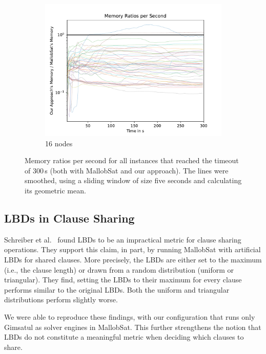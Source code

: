 \documentclass[12pt,a4paper,twoside]{scrartcl}
\numberwithin{equation}{section}
\begin{document}
\begin{figure}[!h]
\begin{subfigure}[c]{.45\textwidth}
    \includegraphics[scale=.45]{plots/16node_compare/mem_ratio_per_second.pdf}
    \caption{16 nodes}
  \end{subfigure}
  \caption{Memory ratios per second for all instances that reached the timeout of $300\,$s (both with MallobSat and our approach). The lines were smoothed, using a sliding window of size five seconds and calculating its geometric mean.}
  \label{fig:memRatiosSecs}
\end{figure}

\subsection{LBDs in Clause Sharing}

Schreiber et al.~\cite{searchOnlyPaper} found LBDs to be an impractical metric for clause sharing operations. They support this claim, in part, by running MallobSat with artificial LBDs for shared clauses. More precisely, the LBDs are either set to the maximum (i.e., the clause length) or drawn from a random distribution (uniform or triangular). They find, setting the LBDs to their maximum for every clause performs similar to the original LBDs. Both the uniform and triangular distributions perform slightly worse.

We were able to reproduce these findings, with our configuration that runs only Gimsatul as solver engines in MallobSat. This further strengthens the notion that LBDs do not constitute a meaningful metric when deciding which clauses to share.

\end{document}
